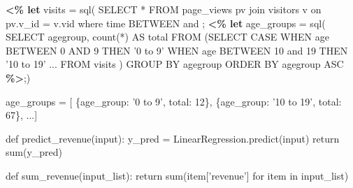 \begin{figure*}
\centering
%
%
\begin{minipage}[c]{8cm}
%
\begin{minipage}[c]{8cm}
\begin{code}
\textbf{<\% let} visits = sql(
   SELECT * FROM page_views pv join visitors v 
   on pv.v_id = v.vid where time BETWEEN 
    and ;
\textbf{<\% let} age_groups = sql(
   SELECT agegroup, count(*) AS total 
   FROM (SELECT CASE
    WHEN age BETWEEN 0 AND 9 THEN '0 to 9'
    WHEN age BETWEEN 10 and 19 THEN '10 to 19'
     ...
    FROM  visits )
   GROUP BY agegroup  
   ORDER BY agegroup ASC \textbf{\%>};)
\end{code}
\vspace*{-0.2cm}
\label{figure:running-example:age-group-data-retrieval}
\vspace*{0cm}
\end{minipage}

\begin{minipage}[c]{8cm}
\begin{code}
age_groups = [
   \{age_group: '0 to 9', total: 12\}, 
   \{age_group: '10 to 19', total: 67\},  ...]
\end{code}
\vspace*{-0.2cm}
\label{figure:running-example:age-group-query-result}
\vspace*{-0cm}
\end{minipage}


\begin{minipage}[c]{8cm}
\begin{code}
def predict_revenue(input):
  y_pred = LinearRegression.predict(input)
  return sum(y_pred)
  
def sum_revenue(input_list):
  return sum(item['revenue'] for item in input_list)
\end{code}
\vspace*{-0.2cm}
\label{figure:python-function-predicting-revenue}
\vspace*{-0cm}
\end{minipage}
%
\end{minipage}
\hspace{1cm}
\begin{minipage}[c]{6cm}


\end{minipage}
\end{figure*}
